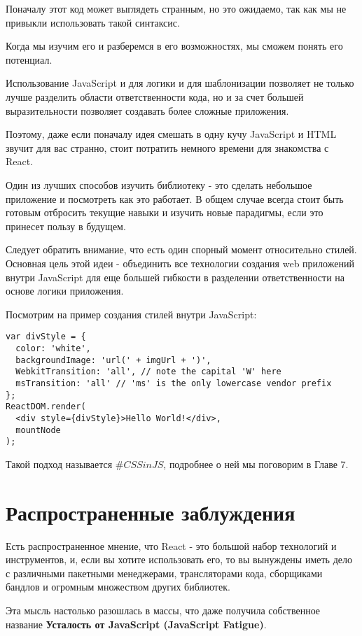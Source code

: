 Поначалу этот код может выглядеть странным, но это ожидаемо, так как мы не привыкли использовать такой синтаксис.

Когда мы изучим его и разберемся в его возможностях, мы сможем понять его потенциал.

Использование JavaScript и для логики и для шаблонизации позволяет не только лучше разделить области ответственности кода, но и за счет большей выразительности позволяет создавать более сложные приложения.

Поэтому, даже если поначалу идея смешать в одну кучу JavaScript и HTML звучит для вас странно, стоит потратить немного времени для знакомства с React.

Один из лучших способов изучить библиотеку - это сделать небольшое приложение и посмотреть как это работает. В общем случае всегда стоит быть готовым отбросить текущие навыки и изучить новые парадигмы, если это принесет пользу в будущем.

Следует обратить внимание, что есть один спорный момент относительно стилей. Основная цель этой идеи - объединить все технологии создания web приложений внутри JavaScript для еще большей гибкости в разделении ответственности на основе логики приложения.

Посмотрим на пример создания стилей внутри JavaScript:

\begin{lstlisting}
var divStyle = {
  color: 'white',
  backgroundImage: 'url(' + imgUrl + ')',
  WebkitTransition: 'all', // note the capital 'W' here
  msTransition: 'all' // 'ms' is the only lowercase vendor prefix
};
ReactDOM.render(
  <div style={divStyle}>Hello World!</div>,
  mountNode
);
\end{lstlisting}

Такой подход называется $\#CSSinJS$, подробнее о ней мы поговорим в Главе 7.

\section{Распространенные заблуждения}

Есть распространенное мнение, что React - это большой набор технологий и инструментов, и, если вы хотите использовать его, то вы вынуждены иметь дело с различными пакетными менеджерами, трансляторами кода, сборщиками бандлов и огромным множеством других библиотек.

Эта мысль настолько разошлась в массы, что даже получила собственное название \textbf{Усталость от JavaScript (JavaScript Fatigue)}.

